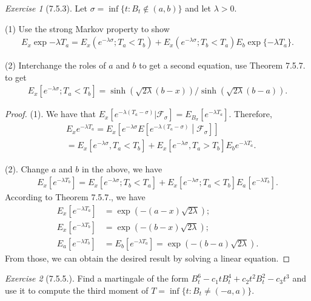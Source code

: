 \documentclass[12pt,a4paper]{amsart}
\theoremstyle{plain}
\theoremstyle{definition}
\theoremstyle{remark}
\newtheorem*{exe}{Exercise}
\numberwithin{equation}{section}
\begin{document}
\begin{exe}[7.5.3]
Let $\sigma = \inf\{t: B_t \not\in (a,b)\}$ and let $\lambda > 0$.

(1) Use the strong Markov property to show
\begin{align}
E_x \exp{-\lambda T_a} 
  = E_x \left( e^{-\lambda \sigma}; T_a < T_b \right) + E_x\left( e^{-\lambda \sigma}; T_b < T_a \right) E_b \exp\{- \lambda T_a\}. 
\end{align}

(2) Interchange the roles of $a$ and $b$ to get a second equation, use Theorem 7.5.7. to get
\begin{align}
  E_x\left[ e^{-\lambda \sigma}; T_a < T_b \right]
 = \sinh(\sqrt{2\lambda} (b-x))/\sinh(\sqrt{2\lambda}(b-a)).
\end{align}
\end{exe}
\begin{proof}
(1). We have that $E_x[e^{- \lambda (T_a - \sigma)}| \mathcal F_\sigma] = E_{B_\sigma}[e^{-\lambda T_a}]$. Therefore,
\begin{align}
  &E_x e^{-\lambda T_a} = E_x \left[ e^{-\lambda \sigma} E\left[ e^{-\lambda (T_a - \sigma)} \middle| \mathcal F_\sigma\right]\right]
  \\&= E_x\left[ e^{-\lambda \sigma}, T_a < T_b \right] + E_x[e^{-\lambda \sigma},T_a>T_b] E_b e^{-\lambda T_a}.
\end{align}

(2). Change $a$ and $b$ in the above, we have
\begin{align}
  E_x\left[ e^{-\lambda T_b} \right]
  = E_x\left[ e^{-\lambda \sigma}; T_b < T_a \right] + E_x\left[ e^{-\lambda \sigma}; T_a < T_b \right] E_a[e^{-\lambda T_b}].
\end{align}
According to Theorem 7.5.7., we have 
\begin{align}
  E_x\left[ e^{-\lambda T_a} \right] &= \exp(-(a-x)\sqrt{2\lambda});
  \\E_x\left[ e^{-\lambda T_b} \right] &= \exp(-(b-x)\sqrt{2\lambda});
\\ E_a[e^{-\lambda T_b}] &= E_b[e^{-\lambda T_a}] = \exp(-(b-a)\sqrt{2\lambda}).
\end{align}
From those, we can obtain the desired result by solving a linear equation.
\end{proof}
\begin{exe}[7.5.5.]
Find a martingale of the form $B_t^6 - c_1tB_t^4+c_2t^2B_t^2-c_3t^3$ and use it to compute the third moment of $T = \inf\{t: B_t \neq (-a,a)\}$.
\end{exe}
\end{document}
